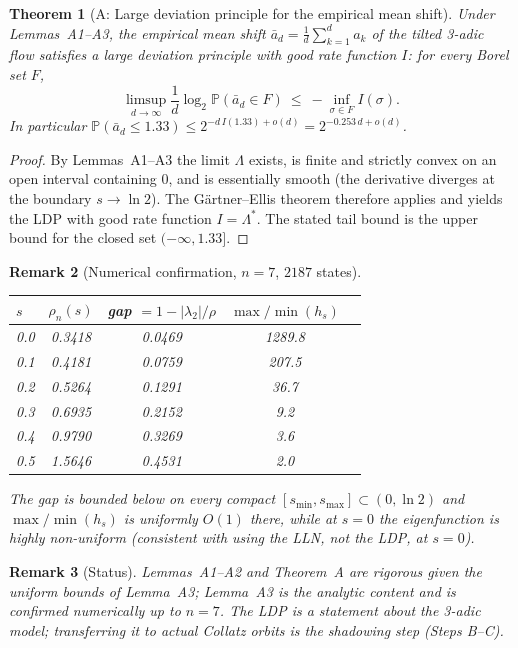 \documentclass[12pt,a4paper]{article}
\newtheorem{theorem}{Theorem}[section]
\newtheorem{remark}[theorem]{Remark}
\begin{document}
\begin{theorem}[A: Large deviation principle for the empirical mean shift]
\label{thm:step_a_ldp}
Under Lemmas~A1--A3, the empirical mean shift $\bar a_d=\frac1d\sum_{k=1}^d a_k$ of the tilted 3-adic flow satisfies a large deviation principle with good rate function $I$: for every Borel set $F$,
\[
\limsup_{d\to\infty}\frac1d\log_2\mathbb P(\bar a_d\in F)\ \le\ -\inf_{\sigma\in F} I(\sigma) .
\]
In particular $\mathbb P(\bar a_d\le1.33)\le 2^{-d\,I(1.33)+o(d)}=2^{-0.253\,d+o(d)}$.
\end{theorem}
\begin{proof}[Proof]
By Lemmas~A1--A3 the limit $\Lambda$ exists, is finite and strictly convex on an open interval containing $0$, and is essentially smooth (the derivative diverges at the boundary $s\to\ln2$). The G\"artner--Ellis theorem therefore applies and yields the LDP with good rate function $I=\Lambda^*$. The stated tail bound is the upper bound for the closed set $(-\infty,1.33]$.
\end{proof}

\begin{remark}[Numerical confirmation, $n=7$, $2187$ states]
\begin{center}
\begin{tabular}{lcccc}
\toprule
$s$ & $\rho_n(s)$ & gap $=1-|\lambda_2|/\rho$ & $\max/\min(h_s)$ \\
\midrule
0.0 & 0.3418 & 0.0469 & 1289.8 \\
0.1 & 0.4181 & 0.0759 & 207.5 \\
0.2 & 0.5264 & 0.1291 & 36.7 \\
0.3 & 0.6935 & 0.2152 & 9.2 \\
0.4 & 0.9790 & 0.3269 & 3.6 \\
0.5 & 1.5646 & 0.4531 & 2.0 \\
\bottomrule
\end{tabular}
\end{center}
The gap is bounded below on every compact $[s_{\min},s_{\max}]\subset(0,\ln2)$ and $\max/\min(h_s)$ is uniformly $O(1)$ there, while at $s=0$ the eigenfunction is highly non-uniform (consistent with using the LLN, not the LDP, at $s=0$).
\end{remark}

\begin{remark}[Status]
Lemmas~A1--A2 and Theorem~A are rigorous given the uniform bounds of Lemma~A3; Lemma~A3 is the analytic content and is confirmed numerically up to $n=7$. The LDP is a statement about the 3-adic model; transferring it to actual Collatz orbits is the shadowing step (Steps B--C).
\end{remark}
\end{document}
